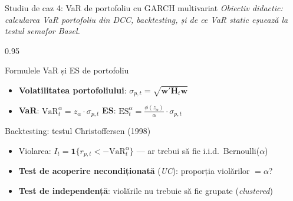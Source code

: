\documentclass[9pt, aspectratio=169, t]{beamer}
\begin{document}
\begin{frame}{Studiu de caz 4: VaR de portofoliu cu GARCH multivariat}
    \vspace{-2mm}
    {\scriptsize\textit{Obiectiv didactic: calcularea VaR portofoliu din DCC, backtesting, și de ce VaR static eșuează la testul semafor Basel.}}\vspace{1mm}
    \begin{cminipage}{0.95\textwidth}
    \vspace{-2mm}
    {\scriptsize
    \begin{block}{Formulele VaR și ES de portofoliu}
        \begin{itemize}\setlength{\itemsep}{0pt}
            \item \textbf{Volatilitatea portofoliului}: $\sigma_{p,t} = \sqrt{\mathbf{w}'\mathbf{H}_t\mathbf{w}}$
            \item \textbf{VaR}: $\text{VaR}_t^\alpha = z_\alpha \cdot \sigma_{p,t}$ \quad \textbf{ES}: $\text{ES}_t^\alpha = \frac{\phi(z_\alpha)}{\alpha} \cdot \sigma_{p,t}$
        \end{itemize}
    \end{block}
    \begin{block}{Backtesting: testul Christoffersen (1998)}
        \begin{itemize}\setlength{\itemsep}{0pt}
            \item Violarea: $I_t = \mathbf{1}\{r_{p,t} < -\text{VaR}_t^\alpha\}$ --- ar trebui să fie i.i.d.\ Bernoulli($\alpha$)
            \item \textbf{Test de acoperire necondiționată} (\textit{UC}): proporția violărilor $= \alpha$?
            \item \textbf{Test de independență}: violările nu trebuie să fie grupate (\textit{clustered})
        \end{itemize}
    \end{block}
    }
    \end{cminipage}
\end{frame}
\end{document}

